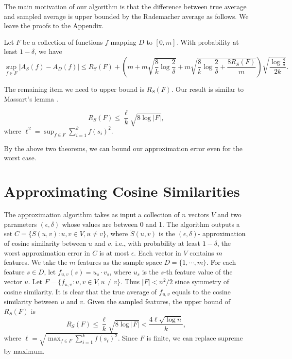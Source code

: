 \documentclass{article}
\begin{document}
The main motivation of our algorithm is that the difference between true average and sampled average is upper bounded by the Rademacher average as follows.
We leave the proofs to the Appendix.

\begin{theorem}
\label{thm:main}
Let $F$ be a collection of functions $f$ mapping $D$ to $[0,m]$. 
With probability at least $1-\delta$, we have
$$\sup_{f\in F}|A_S(f) - A_D(f)| \leq R_S(F) + \left(m+m\sqrt{\frac{8}{k}\log \frac{2}{\delta}} + m\sqrt{\frac{8}{k}\log \frac{2}{\delta} + \frac{8R_S(F)}{m}}\right)\sqrt{\frac{\log \frac{8}{\delta}}{2k}}.$$
\end{theorem}

The remaining item we need to upper bound is $R_S(F)$. Our result is similar to Massart's lemma \cite{AGO14}.

\begin{theorem}
\label{thm2}
$$R_S(F) \leq \frac{\ell}{k}\sqrt{8\log |F|},$$
where $\ell^2 = \sup_{f\in F}\sum_{i=1}^k f(s_i)^2$.
\end{theorem}

By the above two theorems, we can bound our approximation error even for the worst case.


\section{Approximating Cosine Similarities}
\label{sec:acs}
The approximation algorithm takes as input a collection of $n$ vectors $V$ and two parameters $(\epsilon, \delta)$ whose values are between 0 and 1. The algorithm outputs a set $C = \{\tilde{S}(u,v): u,v \in V, u\not= v\}$, where $\tilde{S}(u,v)$ is the $(\epsilon, \delta)$- approximation of cosine similarity between $u$ and $v$, i.e., with probability at least $1-\delta$, the worst approximation error in $C$ is at most $\epsilon$. Each vector in $V$ contains $m$ features. We take the $m$ features as the sample space $D = \{1,\cdots,m\}$. For each feature $s\in D$, let $f_{u,v}(s) = u_s\cdot v_s$, where $u_s$ is the $s$-th feature value of the vector $u$. Let $F = \{f_{u,v}: u,v\in V, u\not= v\}$. Thus $|F| < n^2/2$ since symmetry of cosine similarity. It is clear that the true average of $f_{u,v}$ equals to the cosine similarity between $u$ and $v$. Given the sampled features, the upper bound of $R_S(F)$ is 
$$R_S(F) \leq \frac{\ell}{k}\sqrt{8\log |F|} < \frac{4\ell\sqrt{\log n}}{k},$$
where $\ell = \sqrt{\max_{f\in F} \sum_{i=1}^k f(s_i)^2}$. Since $F$ is finite, we can replace supreme by maximum. 
\end{document}
